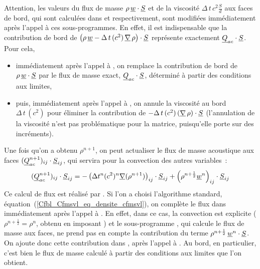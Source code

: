 Attention, les valeurs du flux de masse $\rho\,\underline{w}\cdot\underline{S}$ et
de la viscosité $\Delta\,t\,c^2\frac{S}{d}$ aux faces de
bord, qui sont calculées dans  et  respectivement,
sont modifiées immédiatement après l'appel à ces sous-programmes.
En effet, il est indispensable que la contribution de bord de
$\left(\rho\,\underline{w}-\Delta\,t\,(c^2)\,\underline{\nabla}\,\rho\right)\cdot\underline{S}$
représente exactement $\underline{Q}_{ac}\cdot\underline{S}$.
Pour cela,
\begin{itemize}
\item immédiatement après l'appel à
, on remplace la contribution de bord de
$\rho\,\underline{w}\cdot\underline{S}$
par le flux de masse exact, $\underline{Q}_{ac}\cdot\underline{S}$,
déterminé à partir des conditions aux limites,
\item puis, immédiatement après l'appel à
, on annule la viscosité au bord $\Delta\,t\,(c^2)$ pour
éliminer la contribution de $-\Delta\,t\,(c^2)\,(\underline{\nabla}\,\rho)\cdot\underline{S}$
(l'annulation de la viscosité n'est pas problématique pour la matrice,
puisqu'elle porte sur des incréments).
\end{itemize}

\bigskip

Une fois qu'on a obtenu $\rho^{n+1}$,
on peut actualiser le flux de masse acoustique
aux faces $(\underline{Q}_{ac}^{n+1})_{ij} \cdot \underline{S}_{ij}$,
qui servira pour la convection des autres variables~:
\begin{equation}\label{Cfbl_Cfmsvl_eq_flux_masse_acoustique_cfmsvl}
\displaystyle(\underline{Q}_{ac}^{n+1})_{ij}\cdot\underline{S}_{ij}=
-\left(\Delta t^n (c^2)^n \underline{\nabla}(\rho^{n+1})\right)_{ij}\cdot\underline{S}_{ij}
+\left(\rho^{n+\frac{1}{2}} \underline{w}^n\right)_{ij}\cdot\underline{S}_{ij}\\
\end{equation}
Ce calcul de flux est réalisé par .
Si l'on a choisi l'algorithme standard, équation~(\ref{Cfbl_Cfmsvl_eq_densite_cfmsvl}),
on complète le flux dans  immédiatement après l'appel
à .
En effet, dans ce cas,
la convection est explicite ($\rho^{n+\frac{1}{2}}=\rho^{n}$,
obtenu en imposant )
et le sous-programme ,
qui calcule le flux de masse aux faces,
ne prend pas en compte la contribution du terme
$\rho^{n+\frac{1}{2}}\,\underline{w}^n\cdot\underline{S}$. On ajoute donc cette
contribution dans , après l'appel à .
Au bord, en particulier, c'est bien le flux de masse calculé à partir
des conditions aux limites que l'on obtient.

